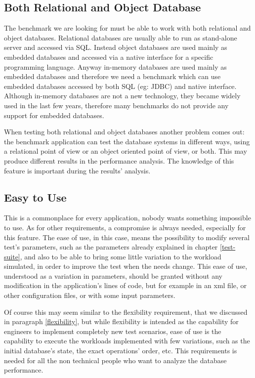 		\subsection{Both Relational and Object Database}
The benchmark we are looking for must be able to work with both relational and object databases. Relational databases are usually able to run as stand-alone server and accessed via SQL. Instead object databases are used mainly as embedded databases and accessed via a native interface for a specific programming language. Anyway in-memory databases are used mainly as embedded databases and therefore we need a benchmark which can use embedded databases accessed by both SQL (eg: JDBC) and native interface. Although in-memory databases are not a new technology, they became widely used in the last few years, therefore many benchmarks do not provide any support for embedded databases.

When testing both relational and object databases another problem comes out: the benchmark application can test the database systems in different ways, using a relational point of view or an object oriented point of view, or both. This may produce different results in the performance analysis. The knowledge of this feature is important during the results' analysis.

		\subsection{Easy to Use}
This is a commonplace for every application, nobody wants something impossible to use. As for other requirements, a compromise is always needed, especially for this feature. The ease of use, in this case, means the possibility to modify several test's parameters, such as the parameters already explained in chapter \ref{test-suite}, and also to be able to bring some little variation to the workload simulated, in order to improve the test when the needs change. This ease of use, understood as a variation in parameters, should be granted without any modification in the application's lines of code, but for example in an xml file, or other configuration files, or with some input parameters.

Of course this may seem similar to the flexibility requirement, that we discussed in paragraph \ref{flexibility}, but while flexibility is intended as the capability for engineers to implement completely new test scenarios, ease of use is the capability to execute the workloads implemented with few variations, such as the initial database's state, the exact operations' order, etc. This requirements is needed for all the non technical people who want to analyze the database performance.

